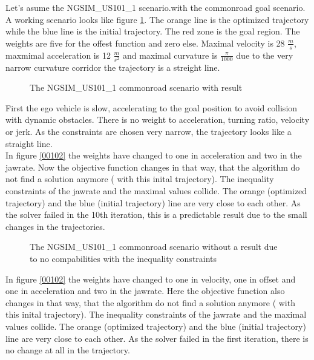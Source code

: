 \documentclass[conference]{IEEEtran}
\begin{document}
\subsubsection{}
Let's asume the NGSIM\_US101\_1 scenario.with the commonroad goal scenario. A working scenario looks like figure \ref{working}. The orange line is the optimized trajectory while the blue line is the initial trajectory. The red zone is the goal region. The weights are five for the offest function and zero else. Maximal velocity is 28 $\frac{m}{s}$, maxmimal acceleration is 12 $\frac{m}{s^2}$ and maximal curvature is $\frac{\pi}{1000}$ due to the very narrow curvature corridor the trajectory is a streight line.
\begin{figure}[h]
\begin{center}

\end{center}
\caption{The NGSIM\_US101\_1 commonroad scenario with result}
\label{working}
\end{figure}
First the ego vehicle is slow, accelerating to the goal position to avoid collision with dynamic obstacles. There is no weight to acceleration, turning ratio, velocity or jerk. As the constraints are chosen very narrow, the trajectory looks like a straight line.\\
In figure \ref{00102} the weights have changed to  one in acceleration and two in the jawrate. Now the objective function changes in that way, that the algorithm do not find a solution anymore ( with this inital trajectory). The inequality constraints of the jawrate and the maximal values collide. The orange (optimized trajectory) and the blue (initial trajectory) line are very close to each other. As the solver failed in the 10th iteration, this is a predictable result due to the small changes in the trajectories.
\begin{figure}[h]
\begin{center}

\end{center}
\caption{The NGSIM\_US101\_1 commonroad scenario without a result due to no compabilities with the inequality constraints}
\label{11102}
\end{figure}
In figure \ref{00102} the weights have changed to  one in velocity, one in offset and one in acceleration and two in the jawrate. Here the objective function also changes in that way, that the algorithm do not find a solution anymore ( with this inital trajectory). The inequality constraints of the jawrate and the maximal values collide. The orange (optimized trajectory) and the blue (initial trajectory) line are very close to each other. As the solver failed in the first iteration, there is no change at all in the trajectory.
\end{document}
